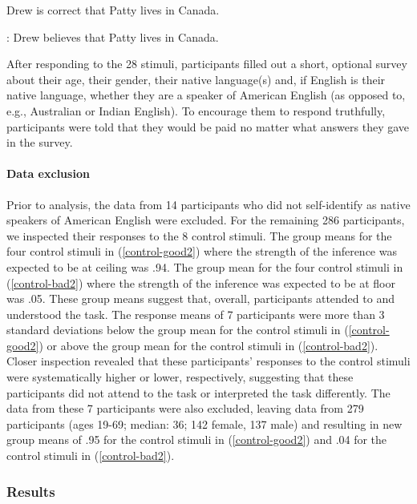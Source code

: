 \documentclass[11pt,fleqn]{article}
\newcommand{\6}{\mbox{$[\hspace*{-.6mm}[$}}
\newcommand{\9}{\mbox{$]\hspace*{-.6mm}]$}}
\begin{document}
\begin{exe}
\ex\label{train2}
\begin{xlist}
 Drew is correct that Patty lives in Canada. 

: Drew believes that Patty lives in Canada.
\end{xlist}
\end{exe}

After responding to the 28 stimuli, participants filled out a short, optional survey about their age, their gender, their native language(s) and, if English is their native language, whether they are a speaker of American English (as opposed to, e.g., Australian or Indian English). To encourage them to respond truthfully, participants were told that they would be paid no matter what answers they gave in the survey.

\paragraph{Data exclusion}

Prior to analysis, the data from 14 participants who did not self-identify as native speakers of American English were excluded. For the remaining 286 participants, we inspected their responses to the 8 control stimuli. The group means for the four control stimuli in (\ref{control-good2}) where the strength of the inference was expected to be at ceiling was .94. The group mean for the four control stimuli in (\ref{control-bad2}) where the strength of the inference was expected to be at floor was .05. These group means suggest that, overall, participants attended to and understood the task. The response means of 7 participants were more than 3 standard deviations below the group mean for the control stimuli in (\ref{control-good2}) or above the group mean for the control stimuli in (\ref{control-bad2}). Closer inspection revealed that these participants' responses to the control stimuli were systematically higher or lower, respectively, suggesting that these participants did not attend to the task or interpreted the task differently. The data from these 7 participants were also excluded, leaving data from 279 participants (ages 19-69; median: 36; 142 female, 137 male) and resulting in new group means of .95 for the control stimuli in (\ref{control-good2}) and .04 for the control stimuli in (\ref{control-bad2}).

\subsubsection{Results}
\end{document}
